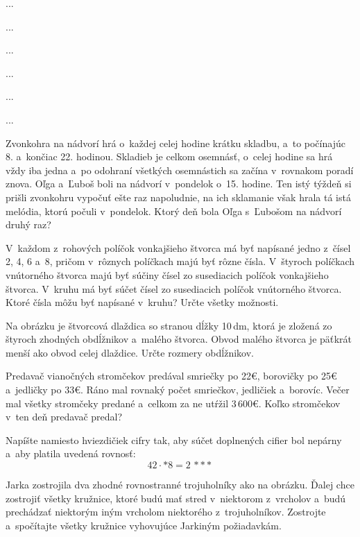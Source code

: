 ﻿{%
...}

{%
...}

{%
...}

{%
...}

{%
...}

{%
...}

{%
Zvonkohra na nádvorí hrá o~každej celej hodine krátku skladbu, a~to počínajúc 8. a~končiac 22. hodinou.
Skladieb je celkom osemnásť, o~celej hodine sa hrá vždy iba jedna a~po odohraní všetkých osemnástich sa začína v~rovnakom poradí znova.
Oľga a~Ľuboš boli na nádvorí v~pondelok o~15. hodine. Ten istý týždeň si prišli zvonkohru vypočuť ešte raz napoludnie, na ich sklamanie však hrala tá istá melódia, ktorú počuli v~pondelok. Ktorý deň bola Oľga s~Ľubošom na nádvorí druhý raz?
}

{%
V~každom z~rohových políčok vonkajšieho štvorca má byť napísané jedno z~čísel 2, 4, 6 a~8, pričom v~rôznych políčkach majú byť rôzne čísla.
V~štyroch políčkach vnútorného štvorca majú byť súčiny čísel zo susediacich políčok vonkajšieho štvorca.
V~kruhu má byť súčet čísel zo susediacich políčok vnútorného štvorca.
Ktoré čísla môžu byť napísané v~kruhu? Určte všetky možnosti.
%
}

{%
Na obrázku je štvorcová dlaždica so stranou dĺžky 10\,dm, ktorá je zložená zo štyroch zhodných obdĺžnikov a~malého štvorca.
Obvod malého štvorca je päťkrát menší ako obvod celej dlaždice.
Určte rozmery obdĺžnikov.
%
}

{%
Predavač vianočných stromčekov predával smriečky po 22€, borovičky po 25€ a~jedličky po 33€.
Ráno mal rovnaký počet smriečkov, jedličiek a~borovíc.
Večer mal všetky stromčeky predané a~celkom za ne utŕžil 3\,600€.
Koľko stromčekov v~ten deň predavač predal?
}

{%
Napíšte namiesto hviezdičiek cifry tak, aby súčet doplnených cifier bol nepárny a~aby platila uvedená rovnosť:
$$
42\cdot *8=2\,{*}{*}{*}
$$}

{%
Jarka zostrojila dva zhodné rovnostranné trojuholníky ako na obrázku.
Ďalej chce zostrojiť všetky kružnice,
ktoré budú mať stred v~niektorom z~vrcholov a~budú prechádzať
niektorým iným vrcholom niektorého z~trojuholníkov.
Zostrojte a~spočítajte všetky kružnice vyhovujúce Jarkiným požiadavkám.
%
}

